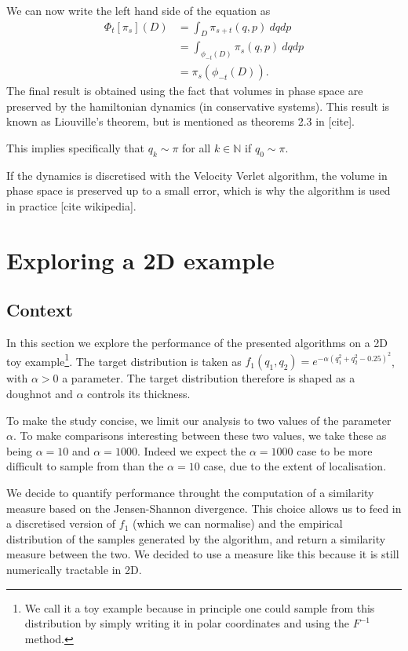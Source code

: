 \documentclass[a4paper, 12pt,oneside]{article}
\begin{document}
			We can now write the left hand side of the equation as
			\begin{align}
				\Phi_t[\pi_s](D)&=\int_D \pi_{s+t}(q,p)\ dqdp \\
					&=\int_{\phi_{-t}(D)}\pi_{s}(q,p)\ dqdp \\
					&=\pi_s(\phi_{-t}(D)).
			\end{align}
			The final result is obtained using the fact that volumes in phase space are preserved by the hamiltonian dynamics (in conservative systems). This result is known as Liouville's theorem, but is mentioned as theorems 2.3 in [cite].
	
			This implies specifically that $q_k\sim\pi$ for all $k\in\mathbb{N}$ if $q_0\sim \pi$. 
	
			If the dynamics is discretised with the Velocity Verlet algorithm, the volume in phase space is preserved up to a small error, which is why the algorithm is used in practice [cite wikipedia].
	\section{Exploring a 2D example}
		\subsection{Context}
		In this section we explore the performance of the presented algorithms on a 2D toy example\footnote{We call it a toy example because in principle one could sample from this distribution by simply writing it in polar coordinates and using the $F^{-1}$ method.}. The target distribution is taken as $f_1(q_1,q_2)=e^{-\alpha(q_1^2+q_2^2-0.25)^2}$, with $\alpha>0$ a parameter. The target distribution therefore is shaped as a doughnot and $\alpha$ controls its thickness. 
		
		To make the study concise, we limit our analysis to two values of the parameter $\alpha$. To make comparisons interesting between these two values, we take these as being $\alpha =10$ and $\alpha=1000$. Indeed we expect the $\alpha=1000$ case to be more difficult to sample from than the $\alpha=10$ case, due to the extent of localisation.

		We decide to quantify performance throught the computation of a similarity measure based on the Jensen-Shannon divergence. This choice allows us to feed in a discretised version of $f_1$ (which we can normalise) and the empirical distribution of the samples generated by the algorithm, and return a similarity measure between the two. We decided to use a measure like this because it is still numerically tractable in 2D.  
\end{document}
